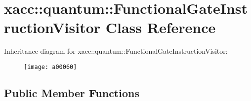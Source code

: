 \hypertarget{a00060}{}\section{xacc\+:\+:quantum\+:\+:Functional\+Gate\+Instruction\+Visitor Class Reference}
\label{a00060}
Inheritance diagram for xacc\+:\+:quantum\+:\+:Functional\+Gate\+Instruction\+Visitor\+:\begin{figure}[H]
\begin{center}
\leavevmode
\texttt{[image: a00060]}
\end{center}
\end{figure}
\subsection*{Public Member Functions}
